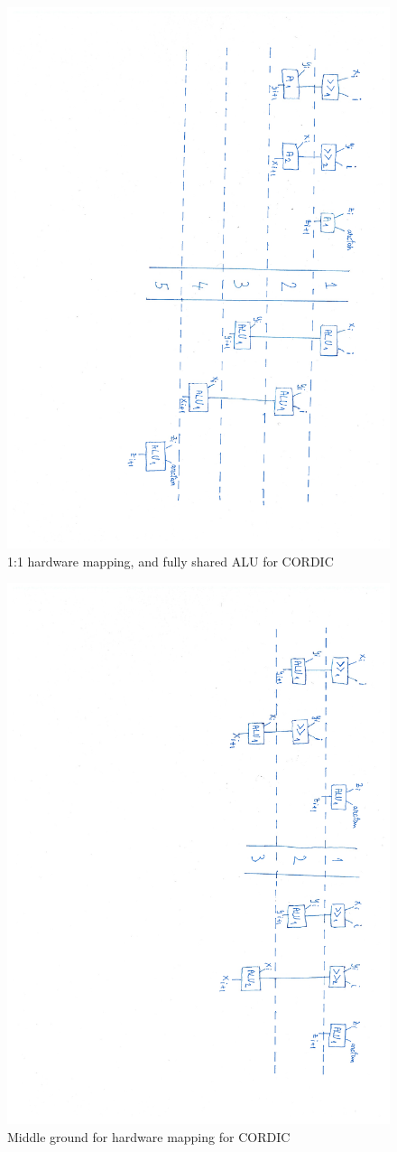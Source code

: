 \documentclass[12pt, a4paper,oneside]{article}
\begin{document}
\begin{figure}[H]
	\centering
	\includegraphics[height = \textwidth,angle=91, trim=6.5cm 3.5cm 1.5cm 3cm, clip]{schedules.pdf}
	\caption{1:1 hardware mapping, and fully shared ALU for CORDIC}
	\label{fig:schedules}
\end{figure}
	

\begin{figure}[H]
	\centering
	\includegraphics[height = \textwidth,angle=91, trim=7cm 5cm 1.5cm 5cm]{schedules_1.pdf}
	\caption{Middle ground for hardware mapping for CORDIC}
	\label{fig:schedules_1}
\end{figure}
\end{document}
